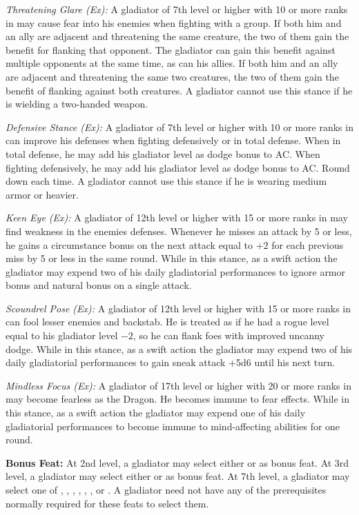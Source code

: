 \textit{Threatening Glare (Ex):} A gladiator of 7th level or higher with 10 or more ranks in  may cause fear into his enemies when fighting with a group. If both him and an ally are adjacent and threatening the same creature, the two of them gain the benefit for flanking that opponent. The gladiator can gain this benefit against multiple opponents at the same time, as can his allies. If both him and an ally are adjacent and threatening the same two creatures, the two of them gain the benefit of flanking against both creatures. A gladiator cannot use this stance if he is wielding a two-handed weapon.

\textit{Defensive Stance (Ex):} A gladiator of 7th level or higher with 10 or more ranks in  can improve his defenses when fighting defensively or in total defense. When in total defense, he may add \onehalf his gladiator level as dodge bonus to AC. When fighting defensively, he may add \onequarter his gladiator level as dodge bonus to AC. Round down each time. A gladiator cannot use this stance if he is wearing medium armor or heavier.

\textit{Keen Eye (Ex):} A gladiator of 12th level or higher with 15 or more ranks in  may find weakness in the enemies defenses. Whenever he misses an attack by 5 or less, he gains a circumstance bonus on the next attack equal to +2 for each previous miss by 5 or less in the same round. While in this stance, as a swift action the gladiator may expend two of his daily gladiatorial performances to ignore armor bonus and natural bonus on a single attack. 

\textit{Scoundrel Pose (Ex):} A gladiator of 12th level or higher with 15 or more ranks in  can fool lesser enemies and backstab. He is treated as if he had a rogue level equal to his gladiator level $-2$, so he can flank foes with improved uncanny dodge. While in this stance, as a swift action the gladiator may expend two of his daily gladiatorial performances to gain sneak attack +5d6 until his next turn.

\textit{Mindless Focus (Ex):} A gladiator of 17th level or higher with 20 or more ranks in  may become fearless as the Dragon. He becomes immune to fear effects. While in this stance, as a swift action the gladiator may expend one of his daily gladiatorial performances to become immune to mind-affecting abilities for one round.

\textbf{Bonus Feat:} At 2nd level, a gladiator may select either  or  as bonus feat. At 3rd level, a gladiator may select either  or  as bonus feat. At 7th level, a gladiator may select one of , , , , , , or . A gladiator need not have any of the prerequisites normally required for these feats to select them.

